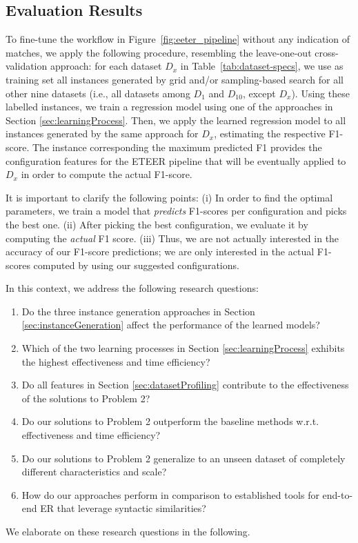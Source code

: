 \subsection{Evaluation Results}
\label{sec:tackleProblem2}
To fine-tune the workflow in Figure~\ref{fig:eeter_pipeline} without any indication of matches, we apply the following procedure, resembling the leave-one-out cross-validation approach: for each dataset $D_x$ in Table~\ref{tab:dataset-specs}, we use as training set all instances generated by grid and/or sampling-based search for all other nine datasets (i.e., all datasets among $D_1$ and $D_{10}$, except $D_x$). Using these labelled instances, we train a regression model using one of the approaches in Section \ref{sec:learningProcess}. Then, we apply the learned regression model to all instances generated by the same approach for $D_x$, estimating the respective F1-score. The instance corresponding the maximum predicted F1 provides the configuration features for the ETEER pipeline that will be eventually applied to $D_x$ in order to compute the actual F1-score.

It is important to clarify the following points: 
(i) In order to find the optimal parameters, we train a model that \emph{predicts} F1-scores per configuration and picks the best one. 
(ii) After picking the best configuration, we evaluate it by computing the \emph{actual} F1 score.
(iii) Thus, we are not actually interested in the accuracy of our F1-score predictions; we are only interested in the actual F1-scores computed by using our suggested configurations.


In this context, we address the following research questions:
\begin{enumerate}[leftmargin=*, label=RQ\arabic*), start=1]
    \item Do the three instance generation approaches in Section \ref{sec:instanceGeneration} affect the performance of the learned models?
    \item Which of the two learning processes in Section \ref{sec:learningProcess} exhibits the highest effectiveness and time efficiency?
    \item Do all features in Section \ref{sec:datasetProfiling} contribute to the effectiveness of the solutions to Problem 2?
    \item Do  our solutions to Problem 2  outperform the baseline methods w.r.t. effectiveness and time efficiency?
    \item Do our solutions to Problem 2 generalize to an unseen dataset of completely different characteristics and scale? 
    \item {How do our approaches perform in comparison to established tools for end-to-end ER that leverage syntactic similarities?}
\end{enumerate}
We elaborate on these research questions in the following.

